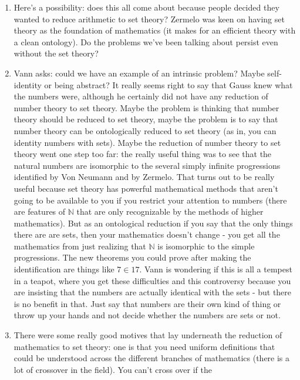 \documentclass[12pt]{article}
\theoremstyle{definition}
\begin{document}
\begin{enumerate}
    \item
        Here's a possibility: does this all come about because people decided
        they wanted to reduce arithmetic to set theory? Zermelo was keen on
        having set theory as the foundation of mathematics (it makes for an
        efficient theory with a clean ontology). Do the problems we've been
        talking about persist even without the set theory?
    \item
        Vann asks: could we have an example of an intrinsic problem? Maybe
        self-identity or being abstract? It really seems right to say that
        Gauss knew what the numbers were, although he certainly did not have
        any reduction of number theory to set theory. Maybe the problem is
        thinking that number theory should be reduced to set theory, maybe the
        problem is to say that number theory can be ontologically reduced to
        set theory (as in, you can identity numbers with sets). Maybe the
        reduction of number theory to set theory went one step too far: the
        really useful thing was to see that the natural numbers are isomorphic
        to the several simply infinite progressions identified by Von Neumann
        and by Zermelo. That turns out to be really useful because set theory
        has powerful mathematical methods that aren't going to be available to
        you if you restrict your attention to numbers (there are features of
        $\mathbb{N}$ that are only recognizable by the methods of higher
        mathematics). But as an ontological reduction if you say that the only
        things there are are sets, then your mathematics doesn't change - you
        get all the mathematics from just realizing that $\mathbb{N}$ is
        isomorphic to the simple progressions. The new theorems you could
        prove after making the identification are things like $7 \in 17$. Vann
        is wondering if this is all a tempest in a teapot, where you get these
        difficulties and this controversy because you are insisting that the
        numbers are actually identical with the sets - but there is no benefit
        in that. Just say that numbers are their own kind of thing or throw up
        your hands and not decide whether the numbers are sets or not.
    \item
        There were some really good motives that lay underneath the reduction
        of mathematics to set theory: one is that you need uniform definitions
        that could be understood across the different branches of mathematics
        (there is a lot of crossover in the field). You can't cross over if the

\end{enumerate}
\end{document}
